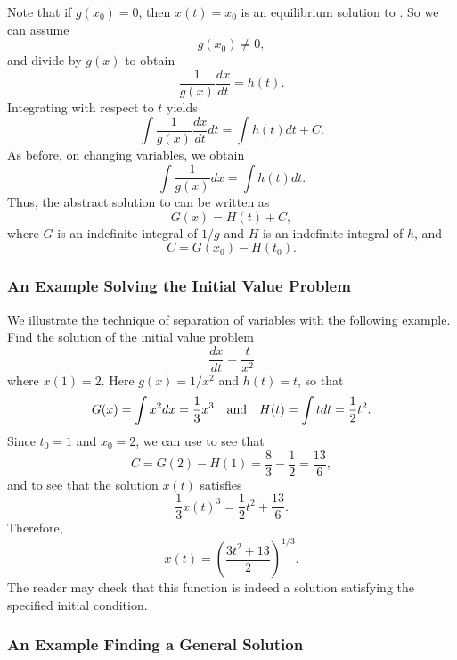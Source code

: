 \documentclass{ximera}
\begin{document}
Note that if $g(x_0)=0$, then $x(t)=x_0$ is an equilibrium solution to 
.  So we can assume 
\begin{equation} \label{eq:gx0}
g(x_0)\not=0,
\end{equation}
and divide  by $g(x)$ to obtain
\[
\frac{1}{g(x)}\frac{dx}{dt}= h(t).
\]
Integrating with respect to $t$ yields
\[
\int \frac{1}{g(x)} \frac{dx}{dt}dt = \int h(t) dt + C.
\]
As before, on changing variables, we obtain
\[
\int\frac{1}{g(x)} dx = \int h(t) dt.
\]
Thus, the abstract solution to  can be written as
\begin{equation} \label{E:G=H+K}
G(x) = H(t) + C,
\end{equation}
where $G$ is an indefinite integral of $1/g$ and $H$ is an indefinite 
integral of $h$, and 
\begin{equation}  \label{E:G=H+Kinit}
C = G(x_0)-H(t_0).
\end{equation}



\subsubsection*{An Example Solving the Initial Value Problem}

We illustrate the technique of separation of variables with the following
example.  Find the solution of the initial value problem
\[
\frac{dx}{dt} = \frac{t}{x^2} 
\]
where $x(1)=2$.  Here $g(x) = 1/x^2$ and $h(t) = t$, so that
\[
G(x)=\int x^2 dx= \frac{1}{3}x^3 \quad\mbox{and}\quad H(t) = \int t dt = \frac{1}{2}t^2.
\]
Since $t_0=1$ and $x_0=2$, we can use  to see that 
\[
C = G(2)-H(1) = \frac{8}{3} -\frac{1}{2} = \frac{13}{6},
\]
and  to see that the solution $x(t)$ satisfies
\[
\frac{1}{3}x(t)^3 = \frac{1}{2}t^2 + \frac{13}{6}.
\]
Therefore,
\[
x(t) = \left(\frac{3t^2+13}{2}\right)^{1/3}.
\]
The reader may check that this function is indeed a solution
satisfying the specified initial condition.

\subsubsection*{An Example Finding a General Solution}
\end{document}
